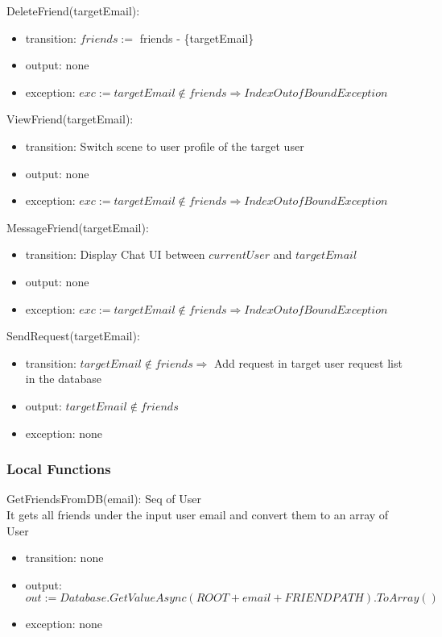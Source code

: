 \documentclass[12pt, titlepage]{article}
\begin{document}
\noindent DeleteFriend(targetEmail):
\begin{itemize}
\item transition: $friends :=$ friends - \{targetEmail\}
\item output: none
\item exception: $exc := targetEmail \notin friends \Rightarrow IndexOutofBound Exception$
\end{itemize}

\noindent ViewFriend(targetEmail):
\begin{itemize}
\item transition: Switch scene to user profile of the target user
\item output: none
\item exception: $exc := targetEmail \notin friends \Rightarrow IndexOutofBound Exception$
\end{itemize}

\noindent MessageFriend(targetEmail):
\begin{itemize}
\item transition: Display Chat UI between $currentUser$ and $targetEmail$
\item output: none
\item exception: $exc := targetEmail \notin friends \Rightarrow IndexOutofBound Exception$
\end{itemize}

\noindent SendRequest(targetEmail):
\begin{itemize}
\item transition: $targetEmail \notin friends \Rightarrow$ Add request in target user request list in the database
\item output: $targetEmail \notin friends$
\item exception: none
\end{itemize}

\subsubsection{Local Functions}

\noindent GetFriendsFromDB(email): Seq of User\\
It gets all friends under the input user email and convert them to an array of User
\begin{itemize}
\item transition: none
\item output: $out := Database.GetValueAsync(ROOT + email + FRIENDPATH).ToArray()$
\item exception: none
\end{itemize}
\end{document}

